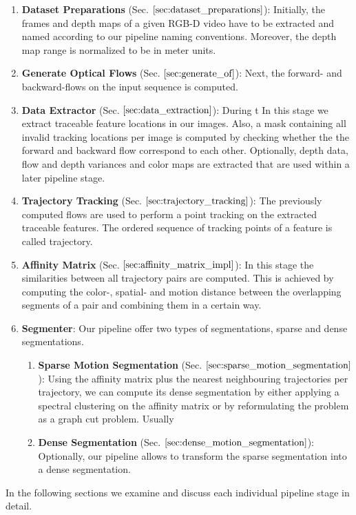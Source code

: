 \begin{enumerate}
\item \textbf{Dataset Preparations} (Sec. $\ref{sec:dataset_preparations}$): Initially, the frames and depth maps of a given RGB-D video have to be extracted and named according to our pipeline naming conventions. Moreover, the depth map range is normalized to be in meter units.
\item \textbf{Generate Optical Flows} (Sec. $\ref{sec:generate_of}$): Next, the forward- and backward-flows on the input sequence is computed.
\item \textbf{Data Extractor} (Sec. $\ref{sec:data_extraction}$): During t
In this stage we extract traceable feature locations in our images. Also, a mask containing all invalid tracking locations per image is computed by checking whether the the forward and backward flow correspond to each other. Optionally, depth data, flow and depth variances and color maps are extracted that are used within a later pipeline stage. 
\item \textbf{Trajectory Tracking} (Sec. $\ref{sec:trajectory_tracking}$): The previously computed flows are used to perform a point tracking on the extracted traceable features. The ordered sequence of tracking points of a feature is called trajectory.
\item \textbf{Affinity Matrix} (Sec. $\ref{sec:affinity_matrix_impl}$): In this stage the similarities between all trajectory pairs are computed. This is achieved by computing the color-, spatial- and motion distance between the overlapping segments of a pair and combining them in a certain way.
\item \textbf{Segmenter}: Our pipeline offer two types of segmentations, sparse and dense segmentations. 
	\begin{enumerate}
	\item \textbf{Sparse Motion Segmentation} (Sec. $\ref{sec:sparse_motion_segmentation}$): Using the affinity matrix plus the nearest neighbouring trajectories per trajectory, we can compute its dense segmentation by either applying a spectral clustering on the affinity matrix or by reformulating the problem as a graph cut problem. Usually
	\item \textbf{Dense Segmentation} (Sec. $\ref{sec:dense_motion_segmentation}$): Optionally, our pipeline allows to transform the sparse segmentation into a dense segmentation. 	
	\end{enumerate}
\end{enumerate}
In the following sections we examine and discuss each individual pipeline stage in detail. 


